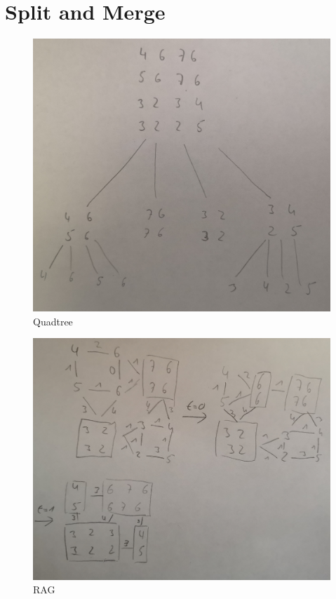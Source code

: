 \section{Split and Merge}
\begin{figure}
	\begin{center}
		\includegraphics[width=\linewidth]{A5/quadtree.jpg}
		\caption{Quadtree}
	\end{center}
\end{figure}

\begin{figure}
	\begin{center}
		\includegraphics[width=\linewidth]{A5/rag.jpg}
		\caption{RAG}
	\end{center}
\end{figure}